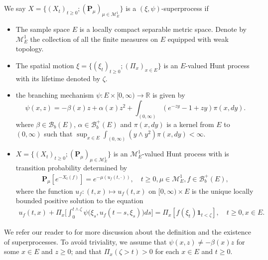 \documentclass[12pt, a4paper]{amsart}
\theoremstyle{definition}
\numberwithin{equation}{section}
\begin{document}
\subsection{}
\label{sec: definition of superprocess}
	We say $X=\{(X_t)_{t\geq 0}; (\mathbf P_\mu)_{\mu \in \mathcal M^1_E}\}$ is a $(\xi,\psi)$-superprocess if
\begin{itemize}
\item
	The sample space $E$ is a locally compact separable metric space. 
	Denote by $\mathcal M_E^1$ the collection of all the finite measures on $E$ equipped with weak topology.
\item
	The spatial motion $\xi=\{(\xi_t)_{t\geq 0};(\Pi_x)_{x\in E}\}$ is an $E$-valued Hunt process with its lifetime denoted by $\zeta$.
\item
	the branching mechanism $\psi: E\times[0,\infty) \to \mathbb R$ is given by 
\begin{equation}
\label{eq: branching mechanism}
	\psi(x,z)=
	- \beta(x) z + \alpha (x) z^2 + \int_{(0,\infty)} (e^{-zy} - 1 + zy) \pi(x,dy).
\end{equation}
	where $\beta \in \mathscr B_b(E)$, $\alpha \in \mathscr B^+_b(E)$ and $\pi(x,dy)$ is a kernel from $E$ to $(0,\infty)$ such that $\sup_{x\in E} \int_{(0,\infty)} (y\wedge y^2) \pi(x,dy) < \infty$.
\item
	$X=\{(X_t)_{t\geq 0}; (\mathbf P_\mu)_{\mu \in \mathcal M^1_E}\}$ is an $\mathcal M^1_E$-valued Hunt process with is transition probability determined by
\begin{align}
	\mathbf P_\mu [e^{-X_t(f)}] = e^{-\mu(u_f(t,\cdot))},
	\quad t\geq 0, \mu \in \mathcal M_E^1, f\in \mathscr B^+_b(E),
\end{align}
	where the function $u_f:(t,x) \mapsto u_f(t,x)$ on $[0,\infty) \times E$ is the unique locally bounded positive solution to the equation
\begin{align}\label{eq:FKPP_in_definition}
	u_f(t,x) + \Pi_x \Big[  \int_0^{t\wedge \zeta} \psi \big(\xi_s,u_f(t-s,\xi_s)\big) ds \Big]
	= \Pi_x [ f(\xi_t)\mathbf 1_{t<\zeta} ],
	\quad t \geq 0, x \in E.
\end{align}
\end{itemize}
	We refer our reader to \cite{Li2011Measure} for more discussion about the definition and the existence of superprocesses.
    To avoid triviality, we assume that $\psi(x,z)\neq -\beta(x)z$ for some $x \in E$ and $z \geq 0$; and that $\Pi_x(\zeta>t)>0$ for each $x \in E$ and $t \geq 0$.
\end{document}
